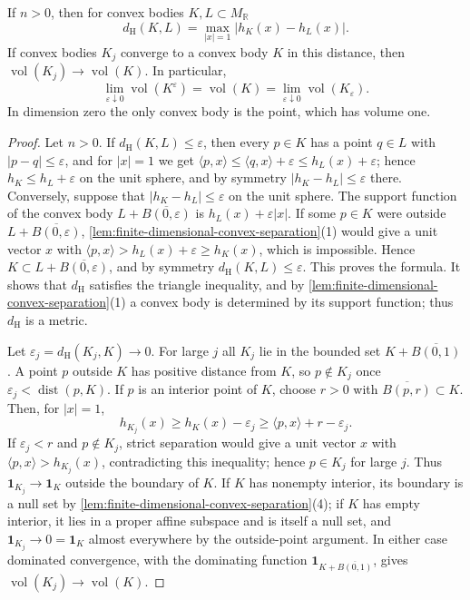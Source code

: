 \begin{proposition}\label{prop:convex-body-volume-continuity}
If $n>0$, then for convex bodies $K,L\subset M_{\mathbb R}$
\[
 d_{\mathrm H}(K,L)=\max_{|x|=1}|h_K(x)-h_L(x)|.
\]
If convex bodies $K_j$ converge to a convex body $K$ in this distance, then $\operatorname{vol}(K_j)\to\operatorname{vol}(K)$. In particular,
\[
 \lim_{\varepsilon\downarrow0}\operatorname{vol}(K^\varepsilon)
 =\operatorname{vol}(K)=
 \lim_{\varepsilon\downarrow0}\operatorname{vol}(K_\varepsilon).
\]
In dimension zero the only convex body is the point, which has volume one.
\end{proposition}
\begin{proof}
Let $n>0$. If $d_{\mathrm H}(K,L)\leq\varepsilon$, then every $p\in K$ has a point $q\in L$ with $|p-q|\leq\varepsilon$, and for $|x|=1$ we get $\langle p,x\rangle\leq\langle q,x\rangle+\varepsilon\leq h_L(x)+\varepsilon$; hence $h_K\leq h_L+\varepsilon$ on the unit sphere, and by symmetry $|h_K-h_L|\leq\varepsilon$ there. Conversely, suppose that $|h_K-h_L|\leq\varepsilon$ on the unit sphere. The support function of the convex body $L+\overline{B(0,\varepsilon)}$ is $h_L(x)+\varepsilon|x|$. If some $p\in K$ were outside $L+\overline{B(0,\varepsilon)}$, \cref{lem:finite-dimensional-convex-separation}(1) would give a unit vector $x$ with $\langle p,x\rangle>h_L(x)+\varepsilon\geq h_K(x)$, which is impossible. Hence $K\subset L+\overline{B(0,\varepsilon)}$, and by symmetry $d_{\mathrm H}(K,L)\leq\varepsilon$. This proves the formula. It shows that $d_{\mathrm H}$ satisfies the triangle inequality, and by \cref{lem:finite-dimensional-convex-separation}(1) a convex body is determined by its support function; thus $d_{\mathrm H}$ is a metric.

Let $\varepsilon_j=d_{\mathrm H}(K_j,K)\to0$. For large $j$ all $K_j$ lie in the bounded set $K+\overline{B(0,1)}$. A point $p$ outside $K$ has positive distance from $K$, so $p\notin K_j$ once $\varepsilon_j<\operatorname{dist}(p,K)$. If $p$ is an interior point of $K$, choose $r>0$ with $\overline{B(p,r)}\subset K$. Then, for $|x|=1$,
\[
 h_{K_j}(x)\geq h_K(x)-\varepsilon_j
          \geq\langle p,x\rangle+r-\varepsilon_j.
\]
If $\varepsilon_j<r$ and $p\notin K_j$, strict separation would give a unit vector $x$ with $\langle p,x\rangle>h_{K_j}(x)$, contradicting this inequality; hence $p\in K_j$ for large $j$. Thus $\mathbf1_{K_j}\to\mathbf1_K$ outside the boundary of $K$. If $K$ has nonempty interior, its boundary is a null set by \cref{lem:finite-dimensional-convex-separation}(4); if $K$ has empty interior, it lies in a proper affine subspace and is itself a null set, and $\mathbf1_{K_j}\to0=\mathbf1_K$ almost everywhere by the outside-point argument. In either case dominated convergence, with the dominating function $\mathbf1_{K+\overline{B(0,1)}}$, gives $\operatorname{vol}(K_j)\to\operatorname{vol}(K)$.


\end{proof}
